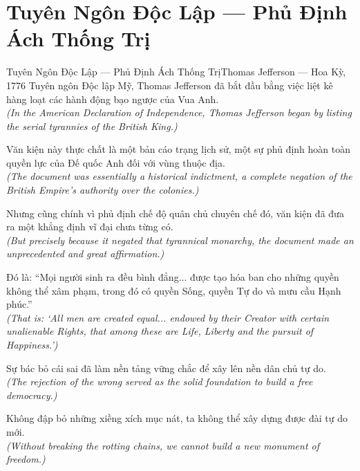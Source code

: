 \section{Tuyên Ngôn Độc Lập --- Phủ Định Ách Thống Trị}
\begin{truyen}{Tuyên Ngôn Độc Lập --- Phủ Định Ách Thống Trị}{Thomas Jefferson --- Hoa Kỳ, 1776}
 Tuyên ngôn Độc lập Mỹ, Thomas Jefferson đã bắt đầu bằng việc liệt kê hàng loạt các hành động bạo ngược của Vua Anh.\\[4pt]
\textit{(In the American Declaration of Independence, Thomas Jefferson began by listing the serial tyrannies of the British King.)}

Văn kiện này thực chất là một bản cáo trạng lịch sử, một sự phủ định hoàn toàn quyền lực của Đế quốc Anh đối với vùng thuộc địa.\\[4pt]
\textit{(The document was essentially a historical indictment, a complete negation of the British Empire's authority over the colonies.)}

Nhưng cũng chính vì phủ định chế độ quân chủ chuyên chế đó, văn kiện đã đưa ra một khẳng định vĩ đại chưa từng có.\\[4pt]
\textit{(But precisely because it negated that tyrannical monarchy, the document made an unprecedented and great affirmation.)}

Đó là: ``Mọi người sinh ra đều bình đẳng... được tạo hóa ban cho những quyền không thể xâm phạm, trong đó có quyền Sống, quyền Tự do và mưu cầu Hạnh phúc.''\\[4pt]
\textit{(That is: `All men are created equal... endowed by their Creator with certain unalienable Rights, that among these are Life, Liberty and the pursuit of Happiness.')}

Sự bác bỏ cái sai đã làm nền tảng vững chắc để xây lên nền dân chủ tự do.\\[4pt]
\textit{(The rejection of the wrong served as the solid foundation to build a free democracy.)}

\end{truyen}
\begin{baihoc}
  Không đập bỏ những xiềng xích mục nát, ta không thể xây dựng được đài tự do mới.\\[4pt]
  \textit{(Without breaking the rotting chains, we cannot build a new monument of freedom.)}
\end{baihoc}

